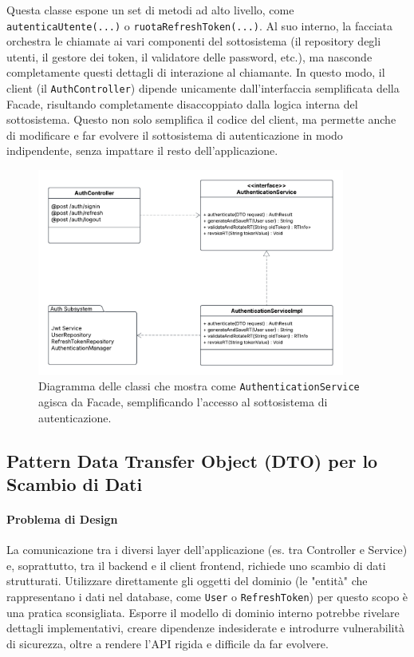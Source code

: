 \documentclass[12pt,a4paper,openright,twoside]{book}
\begin{document}
Questa classe espone un set di metodi ad alto livello, come \texttt{autentica\allowbreak Utente\allowbreak (...)} o \texttt{ruota\allowbreak Refresh\allowbreak Token\allowbreak (...)}. Al suo interno, la facciata orchestra le chiamate ai vari componenti del sottosistema (il repository degli utenti, il gestore dei token, il validatore delle password, etc.), ma nasconde completamente questi dettagli di interazione al chiamante. In questo modo, il client (il \texttt{Auth\allowbreak Controller}) dipende unicamente dall'interfaccia semplificata della Facade, risultando completamente disaccoppiato dalla logica interna del sottosistema. Questo non solo semplifica il codice del client, ma permette anche di modificare e far evolvere il sottosistema di autenticazione in modo indipendente, senza impattare il resto dell'applicazione.

\begin{figure}[H]
    \centering
    \includegraphics[width=0.9\textwidth]{figures/facade.pdf}
    \caption{Diagramma delle classi che mostra come \texttt{AuthenticationService} agisca da Facade, semplificando l'accesso al sottosistema di autenticazione.}
    \label{fig:facade_uml}
\end{figure}

\subsection{Pattern Data Transfer Object (DTO) per lo Scambio di Dati}
\label{subsec:design_dto}

\paragraph{Problema di Design}
La comunicazione tra i diversi layer dell'applicazione (es. tra Controller e Service) e, soprattutto, tra il backend e il client frontend, richiede uno scambio di dati strutturati. Utilizzare direttamente gli oggetti del dominio (le "entità" che rappresentano i dati nel database, come \texttt{User} o \texttt{RefreshToken}) per questo scopo è una pratica sconsigliata. Esporre il modello di dominio interno potrebbe rivelare dettagli implementativi, creare dipendenze indesiderate e introdurre vulnerabilità di sicurezza, oltre a rendere l'API rigida e difficile da far evolvere.
\end{document}
